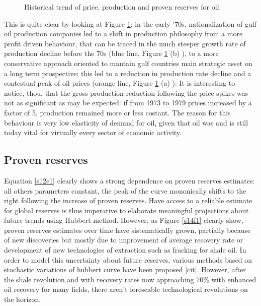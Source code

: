 \documentclass[11pt]{article} %
\begin{document}
\begin{figure}
\caption{Historical trend of price, production and proven reserves for oil}
\label{s13f1}
\end{figure}

This is quite clear by looking at Figure \ref{s13f1}: in the early '70s, nationalization of gulf oil production companies led to a shift in production philosophy from a more profit driven behaviour, that can be traced in the much steeper growth rate of production decline before the 70s (blue line, Figure \ref{s13f1} (b) ), to a more conservative  approach oriented to mantain gulf countries main strategic asset on a long term prospective; this led to a reduction in production rate decline and a contestual peak of oil prices (orange line, Figure \ref{s13f1} (a) ). It is interesting to notice, thou, that the gross production reduction following the price spikes was not as significant as may be expected: if from 1973 to 1979 prices increased by a factor of 5, production remained more or less costant. The reason for this behaviour is very low elasticity of demand for oil, given that oil was and is still today vital for virtually every sector of economic activity.

\subsection{Proven reserves} \label{prres}

Equation \ref{s12e1} clearly shows a strong dependence on proven reserves estimates: all others parameters constant, the peak of the curve mononically shifts to the right following the increase of proven reserves. Have access to a reliable estimate for global reserves is thus imperative to elaborate meaningful projections about future trends using Hubbert method. However, as Figure \ref{s14f1} clearly show, proven reserves estimates over time have sistematically grown, partially because of new discoveries but mostly due to improvement of average recovery rate or development of new technologies of extraction such as fracking for shale oil.  In order to model this uncertainty about future reserves, various methods based on stochastic variations of hubbert curve have been proposed [cit]. However, after the shale revolution and with recovery rates now approaching 70\% with enhanced oil recovery for many fields, there aren't foreseable technological revolutions on the horizon. 
\end{document}
